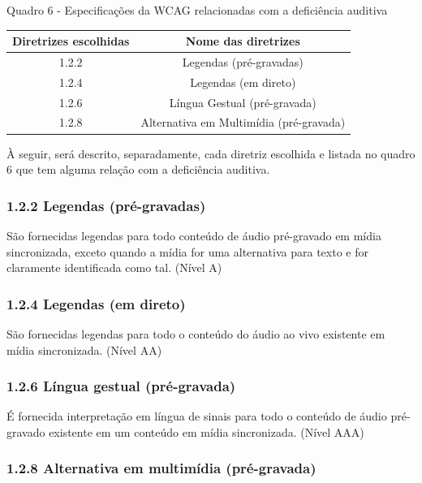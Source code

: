 \documentclass[a4paper]{article}
\begin{document}
\begin{titlepage}
Quadro 6 - Especificações da WCAG relacionadas com a deficiência auditiva\\[-1cm]
\begin{center}
	\begin{longtable}{|c|c|}
		\hline
		Diretrizes escolhidas & Nome das diretrizes\\
		\hline
		1.2.2 & Legendas (pré-gravadas)\\
		\hline
		1.2.4 & Legendas (em direto)\\
		\hline
		1.2.6 & Língua Gestual (pré-gravada)\\
		\hline
		1.2.8 & Alternativa em Multimídia (pré-gravada)\\
		\hline
	\end{longtable}
\end{center}

À seguir, será descrito, separadamente, cada diretriz escolhida e listada no quadro 6 que tem alguma relação com a deficiência auditiva.

\subsubsection{1.2.2 Legendas (pré-gravadas)}

São fornecidas legendas para todo conteúdo de áudio pré-gravado em mídia sincronizada, exceto quando a mídia for uma alternativa para texto e for claramente identificada como tal. (Nível A)

\subsubsection{1.2.4 Legendas (em direto)}

São fornecidas legendas para todo o conteúdo do áudio ao vivo existente em mídia sincronizada. (Nível AA)

\subsubsection{1.2.6 Língua gestual (pré-gravada)}

É fornecida interpretação em língua de sinais para todo o conteúdo de áudio pré-gravado existente em um conteúdo em mídia sincronizada. (Nível AAA)

\subsubsection{1.2.8 Alternativa em multimídia (pré-gravada)}


\end{titlepage}
\end{document}

